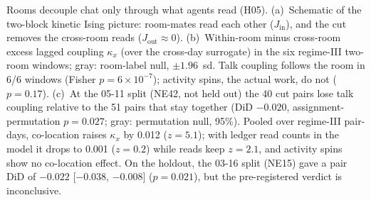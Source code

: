 \caption{Rooms decouple chat only through what agents read (H05). (a)~Schematic of the two-block kinetic Ising picture: room-mates read each other ($J_\mathrm{in}$), and the cut removes the cross-room reads ($J_\mathrm{out}\approx0$). (b)~Within-room minus cross-room excess lagged coupling $\kappa_x$ (over the cross-day surrogate) in the six regime-III two-room windows; gray: room-label null, $\pm1.96$~sd. Talk coupling follows the room in 6/6 windows (Fisher $p=6\times10^{-7}$); activity spins, the actual work, do not ($p=0.17$). (c)~At the 05-11 split (NE42, not held out) the 40 cut pairs lose talk coupling relative to the 51 pairs that stay together (DiD $-0.020$, assignment-permutation $p=0.027$; gray: permutation null, 95\%). Pooled over regime-III pair-days, co-location raises $\kappa_x$ by 0.012 ($z=5.1$); with ledger read counts in the model it drops to 0.001 ($z=0.2$) while reads keep $z=2.1$, and activity spins show no co-location effect. On the holdout, the 03-16 split (NE15) gave a pair DiD of $-0.022$ [$-0.038$, $-0.008$] ($p=0.021$), but the pre-registered verdict is inconclusive.}
\label{fig:H05}
